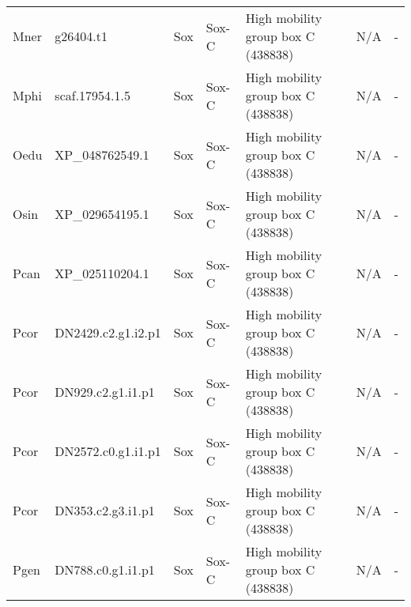 \documentclass[../main.tex]{subfiles}
\begin{document}
\begin{landscape}
\begin{longtable}{lllllll}
		Mner           & g26404.t1             & Sox            & Sox-C               & High mobility group box C (438838)          & N/A                                                                    & -                    \\
		Mphi           & scaf.17954.1.5        & Sox            & Sox-C               & High mobility group box C (438838)          & N/A                                                                    & -                    \\
		Oedu           & XP\_048762549.1       & Sox            & Sox-C               & High mobility group box C (438838)          & N/A                                                                    & -                    \\
		Osin           & XP\_029654195.1       & Sox            & Sox-C               & High mobility group box C (438838)          & N/A                                                                    & -                    \\
		Pcan           & XP\_025110204.1       & Sox            & Sox-C               & High mobility group box C (438838)          & N/A                                                                    & -                    \\
		Pcor           & DN2429.c2.g1.i2.p1    & Sox            & Sox-C               & High mobility group box C (438838)          & N/A                                                                    & -                    \\
		Pcor           & DN929.c2.g1.i1.p1     & Sox            & Sox-C               & High mobility group box C (438838)          & N/A                                                                    & -                    \\
		Pcor           & DN2572.c0.g1.i1.p1    & Sox            & Sox-C               & High mobility group box C (438838)          & N/A                                                                    & -                    \\
		Pcor           & DN353.c2.g3.i1.p1     & Sox            & Sox-C               & High mobility group box C (438838)          & N/A                                                                    & -                    \\
		Pgen           & DN788.c0.g1.i1.p1     & Sox            & Sox-C               & High mobility group box C (438838)          & N/A                                                                    & -                    \\

\end{longtable}
\end{landscape}
\end{document}
